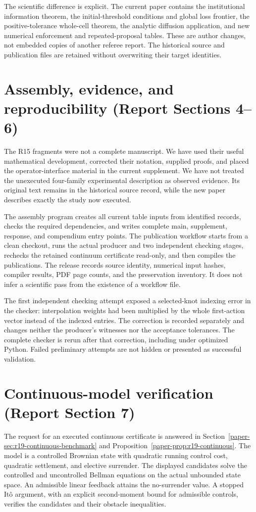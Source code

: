 The scientific difference is explicit. The current paper contains the institutional information theorem, the initial-threshold conditions and global loss frontier, the positive-tolerance whole-cell theorem, the analytic diffusion application, and new numerical enforcement and repeated-proposal tables. These are author changes, not embedded copies of another referee report. The historical source and publication files are retained without overwriting their target identities.

\section{Assembly, evidence, and reproducibility (Report Sections 4--6)}
The R15 fragments were not a complete manuscript. We have used their useful mathematical development, corrected their notation, supplied proofs, and placed the operator-interface material in the current supplement. We have not treated the unexecuted four-family experimental description as observed evidence. Its original text remains in the historical source record, while the new paper describes exactly the study now executed.

The assembly program creates all current table inputs from identified records, checks the required dependencies, and writes complete main, supplement, response, and compendium entry points. The publication workflow starts from a clean checkout, runs the actual producer and two independent checking stages, rechecks the retained continuum certificate read-only, and then compiles the publications. The release records source identity, numerical input hashes, compiler results, PDF page counts, and the preservation inventory. It does not infer a scientific pass from the existence of a workflow file.

The first independent checking attempt exposed a selected-knot indexing error in the checker: interpolation weights had been multiplied by the whole first-action vector instead of the indexed entries. The correction is recorded separately and changes neither the producer's witnesses nor the acceptance tolerances. The complete checker is rerun after that correction, including under optimized Python. Failed preliminary attempts are not hidden or presented as successful validation.

\section{Continuous-model verification (Report Section 7)}
The request for an executed continuous certificate is answered in Section~\ref{paper-sec:r19-continuous-benchmark} and Proposition~\ref{paper-prop:r19-continuous}. The model is a controlled Brownian state with quadratic running control cost, quadratic settlement, and elective surrender. The displayed candidates solve the controlled and uncontrolled Bellman equations on the actual unbounded state space. An admissible linear feedback attains the no-surrender value. A stopped It\^o argument, with an explicit second-moment bound for admissible controls, verifies the candidates and their obstacle inequalities.

